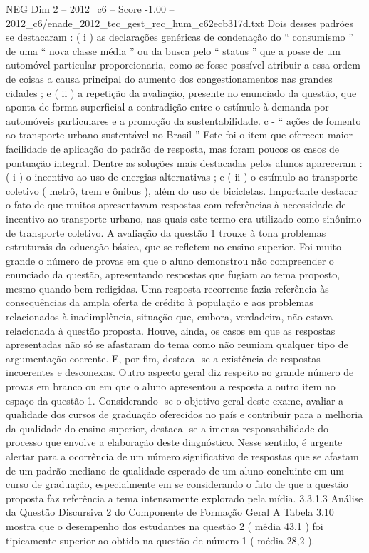 \begin{textsample}{NEG Dim 2 – 2012\_c6 – Score -1.00 – 2012\_c6/enade\_2012\_tec\_gest\_rec\_hum\_c62ecb317d.txt}
Dois desses padrões se destacaram : ( i ) as declarações genéricas de condenação do “ consumismo ” de uma “ nova classe média ” ou da busca pelo “ status ” que a posse de um automóvel particular proporcionaria, como se fosse possível atribuir a essa ordem de coisas a causa principal do aumento dos congestionamentos nas grandes cidades ; e ( ii ) a repetição da avaliação, presente no enunciado da questão, que aponta de forma superficial a contradição entre o estímulo à demanda por automóveis particulares e a promoção da sustentabilidade. c - “ ações de fomento ao transporte urbano sustentável no Brasil ” Este foi o item que ofereceu maior facilidade de aplicação do padrão de resposta, mas foram poucos os casos de pontuação integral.
Dentre as soluções mais destacadas pelos alunos apareceram : ( i ) o incentivo ao uso de energias alternativas ; e ( ii ) o estímulo ao transporte coletivo ( metrô, trem e ônibus ), além do uso de bicicletas.
Importante destacar o fato de que muitos apresentavam respostas com referências à necessidade de incentivo ao transporte urbano, nas quais este termo era utilizado como sinônimo de transporte coletivo.
A avaliação da questão 1 trouxe à tona problemas estruturais da educação básica, que se refletem no ensino superior.
Foi muito grande o número de provas em que o aluno demonstrou não compreender o enunciado da questão, apresentando respostas que fugiam ao tema proposto, mesmo quando bem redigidas.
Uma resposta recorrente fazia referência às consequências da ampla oferta de crédito à população e aos problemas relacionados à inadimplência, situação que, embora, verdadeira, não estava relacionada à questão proposta.
Houve, ainda, os casos em que as respostas apresentadas não só se afastaram do tema como não reuniam qualquer tipo de argumentação coerente.
E, por fim, destaca -se a existência de respostas incoerentes e desconexas.
Outro aspecto geral diz respeito ao grande número de provas em branco ou em que o aluno apresentou a resposta a outro item no espaço da questão 1.
Considerando -se o objetivo geral deste exame, avaliar a qualidade dos cursos de graduação oferecidos no país e contribuir para a melhoria da qualidade do ensino superior, destaca -se a imensa responsabilidade do processo que envolve a elaboração deste diagnóstico.
Nesse sentido, é urgente alertar para a ocorrência de um número significativo de respostas que se afastam de um padrão mediano de qualidade esperado de um aluno concluinte em um curso de graduação, especialmente em se considerando o fato de que a questão proposta faz referência a tema intensamente explorado pela mídia. 3.3.1.3 Análise da Questão Discursiva 2 do Componente de Formação Geral A Tabela 3.10 mostra que o desempenho dos estudantes na questão 2 ( média 43,1 ) foi tipicamente superior ao obtido na questão de número 1 ( média 28,2 ).

\end{textsample}
